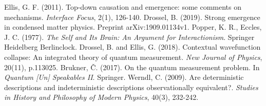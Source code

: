 \documentclass[12pt]{article}
\begin{document}
\begin{small}
\begin{thebibliography}{200}
 Ellis, G. F. (2011). Top-down causation and emergence: some comments on mechanisms. \emph{Interface Focus}, 2(1), 126-140.
 Drossel, B. (2019). Strong emergence in condensed matter physics. Preprint arXiv:1909.01134v1.
 Popper, K. R., Eccles, J. C. (1977). \emph{The Self and Its Brain: An Argument for Interactionism}. Springer Heidelberg Berlinclock.
 Drossel, B. and Ellis, G. (2018). Contextual wavefunction collapse: An integrated theory of quantum measurement. \emph{New Journal of Physics}, 20(11), p.113025.
 Brukner, \v{C}. (2017). On the quantum measurement problem. In \emph{Quantum [Un] Speakables II}. Springer.
 Werndl, C. (2009). Are deterministic descriptions and indeterministic descriptions observationally equivalent?. \emph{Studies in History and Philosophy of Modern Physics}, 40(3), 232-242.

\end{thebibliography}
\end{small}
\end{document}
